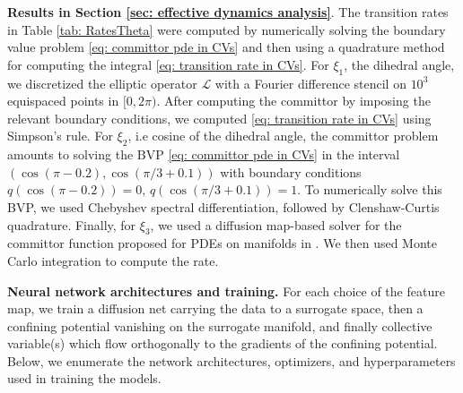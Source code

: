 \documentclass[reqno, 12pt]{article}
\begin{document}
\textbf{Results in Section \ref{sec: effective dynamics analysis}}. The transition rates in Table \eqref{tab: RatesTheta} were computed by numerically solving the boundary value problem \eqref{eq: committor pde in CVs} and then using a quadrature method for computing the integral \eqref{eq: transition rate in CVs}. For $\xi_1$, the dihedral angle, we discretized the elliptic operator $\mathcal{L}$ with a Fourier difference stencil on $10^3$ equispaced points in $[0, 2\pi)$. After computing the committor by imposing the relevant boundary conditions, we computed \eqref{eq: transition rate in CVs} using Simpson's rule. For $\xi_2$, i.e cosine of the dihedral angle, the committor problem amounts to solving the BVP \eqref{eq: committor pde in CVs} in the interval $(\cos(\pi - 0.2), \cos(\pi/3 + 0.1))$ with boundary conditions $q(\cos(\pi - 0.2)) = 0, \, q(\cos(\pi/3 + 0.1)) = 1$. To numerically solve this BVP, we used Chebyshev spectral differentiation, followed by Clenshaw-Curtis quadrature. Finally, for $\xi_3$, we used a diffusion map-based solver for the committor function proposed for PDEs on manifolds in \cite{evans2022computing, sule2023sharp}. We then used Monte Carlo integration to compute the rate. 


\textbf{Neural network architectures and training.} 
For each choice of the feature map, we train a diffusion net carrying the data to a surrogate space, then a confining potential vanishing on the surrogate manifold, and finally collective variable(s) which flow orthogonally to the gradients of the confining potential. Below, we enumerate the network architectures, optimizers, and hyperparameters used in training the models. 
\end{document}
